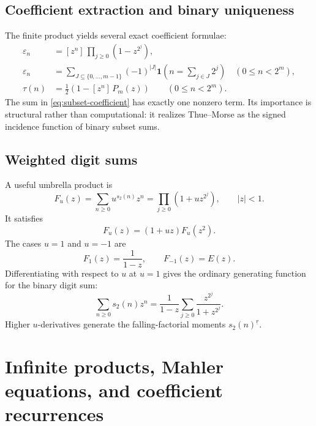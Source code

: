 \documentclass[11pt,oneside]{article}
\theoremstyle{definition}
\theoremstyle{remark}
\newcommand{\bitsum}{s_2}
\newcommand{\eps}{\varepsilon}
\newcommand{\ind}{\mathbf 1}
\newcommand{\coeff}[2]{[z^{#1}]\,#2}
\newcommand{\fall}[2]{#1^{\underline{#2}}}
\begin{document}
\subsection{Coefficient extraction and binary uniqueness}

The finite product yields several exact coefficient formulae:
\begin{align}
 \eps_n
 &=\coeff n{\prod_{j\ge0}(1-z^{2^j})},\label{eq:coefficient-infinite-formal}\\
 \eps_n
 &=\sum_{J\subseteq\{0,\ldots,m-1\}}
    (-1)^{|J|}\ind\!\left(n=\sum_{j\in J}2^j\right)
    \quad(0\le n<2^m),\label{eq:subset-coefficient}\\
 \tau(n)&=\frac12\left(1-\coeff n{P_m(z)}\right)
    \qquad(0\le n<2^m).
\end{align}
The sum in \cref{eq:subset-coefficient} has exactly one nonzero term.  Its
importance is structural rather than computational: it realizes Thue--Morse as
the signed incidence function of binary subset sums.

\subsection{Weighted digit sums}

A useful umbrella product is
\begin{equation}\label{eq:Fu}
 F_u(z)=\sum_{n\ge0}u^{\bitsum(n)}z^n
       =\prod_{j\ge0}(1+u z^{2^j}),
 \qquad |z|<1.
\end{equation}
It satisfies
\begin{equation}\label{eq:Fu-mahler}
 F_u(z)=(1+uz)F_u(z^2).
\end{equation}
The cases $u=1$ and $u=-1$ are
\begin{equation}\label{eq:Fu-special}
 F_1(z)=\frac1{1-z},
 \qquad
 F_{-1}(z)=E(z).
\end{equation}
Differentiating with respect to $u$ at $u=1$ gives the ordinary generating
function for the binary digit sum:
\begin{equation}\label{eq:digit-sum-ogf}
 \sum_{n\ge0}\bitsum(n)z^n
 =\frac1{1-z}\sum_{j\ge0}\frac{z^{2^j}}{1+z^{2^j}}.
\end{equation}
Higher $u$-derivatives generate the falling-factorial moments
$\fall{\bitsum(n)}r$.

\section{Infinite products, Mahler equations, and coefficient recurrences}
\end{document}

